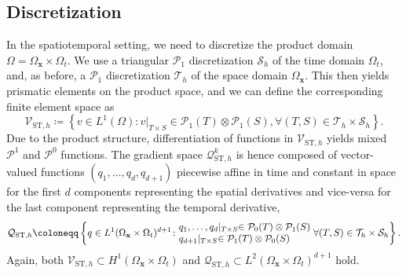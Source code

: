 \documentclass{article}
\newcommand{\OmegaSpace}{\Omega_\mathbf{x}}
\newcommand{\OmegaTime}{\Omega_t}
\begin{document}
	\subsection{Discretization}
	In the spatiotemporal setting, we need to discretize the product domain $\Omega = \OmegaSpace\times  \OmegaTime$.
	We use a triangular $\mathcal{P}_1$ discretization $\mathcal{S}_h$ of the time domain $\OmegaTime$, and, as before, a $\mathcal{P}_1$ discretization $\mathcal{T}_h$ of the space domain $\OmegaSpace$.
	This then yields prismatic elements on the product space, and we can define the corresponding finite element space as 
	\begin{equation}\label{eq:defStTriangulation}
		\mathcal{V}_{\text{ST}, h} \coloneqq \left\lbrace v\in L^1(\Omega) \colon v\lvert_{T \times S}\in \mathcal{P}_1(T) \otimes\mathcal{P}_1(S), \forall (T, S) \in \mathcal{T}_h \times \mathcal{S}_h \right\rbrace.
	\end{equation}
	Due to the product structure, differentiation of functions in $\mathcal{V}_{\text{ST}, h}$ yields mixed $\mathcal{P}^1$ and $\mathcal{P}^0$ functions.
	The gradient space $\mathcal{Q}_{\text{ST}, h}^k$ is hence composed of vector-valued functions $(q_1, \ldots, q_d, q_{d+1})$ piecewise affine in time and constant in space for the first $d$ components representing the spatial derivatives and vice-versa for the last component representing the temporal derivative,
	\begin{equation}
		\label{eq:defSTSpace}
		\mathcal{Q}_{\text{ST}, h} \coloneqq \left\lbrace q\in L^1(\OmegaSpace\times\OmegaTime)^{d+1}\colon\hspace{-.2cm}\begin{tabular}{l}
			$q_1,\ldots,q_d \lvert_{T \times S}\in \mathcal{P}_0(T)\otimes\mathcal{P}_1(S)$\\
			$q_{d+1}\lvert_{T \times S} \in \mathcal{P}_1(T) \otimes \mathcal{P}_0(S)$
		\end{tabular} \hspace{-.1cm}\forall   (T, S) \in \mathcal{T}_h \times \mathcal{S}_h\right\rbrace. 
	\end{equation}
	Again, both $\mathcal{V}_{\text{ST}, h} \subset H^1(\OmegaSpace\times {\OmegaTime})$ and $\mathcal{Q}_{\text{ST}, h} \subset L^2(\OmegaSpace\times {\OmegaTime})^{d+1}$ hold.
\end{document}
